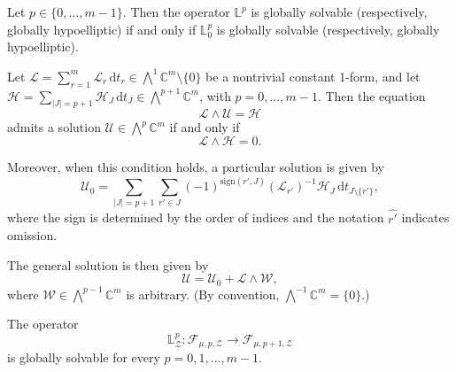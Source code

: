 \documentclass[10pt,a4paper]{amsart}
\begin{document}
\begin{proposition}\label{equiv_L0}
	Let $p \in \{0, \ldots, m - 1\}$. Then 
the operator $\mathbb{L}^p$ is globally solvable (respectively, globally hypoelliptic) if and only if $\mathbb{L}_0^p$ is globally solvable (respectively, globally hypoelliptic).
\end{proposition}

\begin{lemma}\label{sol_ext_alg}
	Let $\mathscr{L} = \sum_{r=1}^m \mathscr{L}_r \, \mathrm{d}t_r \in \textstyle\bigwedge^1 \mathbb{C}^m \setminus \{0\}$ be a nontrivial constant 1-form, and let $\mathscr{H} = \sum_{|J| = p+1} \mathscr{H}_J \, \mathrm{d}t_J \in \textstyle\bigwedge^{p+1} \mathbb{C}^m$, with $p = 0, \ldots, m-1$. Then the equation
	\[
	\mathscr{L} \wedge \mathscr{U} = \mathscr{H}
	\]
	admits a solution $\mathscr{U} \in \textstyle\bigwedge^p \mathbb{C}^m$ if and only if
	\[
	\mathscr{L} \wedge \mathscr{H} = 0.
	\]
	
	Moreover, when this condition holds, a particular solution is given by
	\[
	\mathscr{U}_0 = \sum_{|J|=p+1} \sum_{r' \in J} (-1)^{\mathrm{sign}(r', J)} (\mathscr{L}_{r'})^{-1} \mathscr{H}_J \, \mathrm{d}t_{J \setminus \{r'\}},
	\]
	where the sign is determined by the order of indices and the notation $\widehat{r'}$ indicates omission.
	
	The general solution is then given by
	\[
	\mathscr{U} = \mathscr{U}_0 + \mathscr{L} \wedge \mathscr{W},
	\]
	where $\mathscr{W} \in \textstyle\bigwedge^{p-1} \mathbb{C}^m$ is arbitrary. (By convention, $\textstyle\bigwedge^{-1} \mathbb{C}^m = \{0\}$.)
\end{lemma}

\begin{proposition}
	The operator
	\[
	\mathbb{L}^p_{\mathcal{Z}} :
	\mathscr{F}_{\mu,p,\mathcal{Z}}
	\longrightarrow
	\mathscr{F}_{\mu,p+1,\mathcal{Z}}
	\]
	is globally solvable for every $p=0,1,\dots,m-1$.
\end{proposition}
\end{document}
